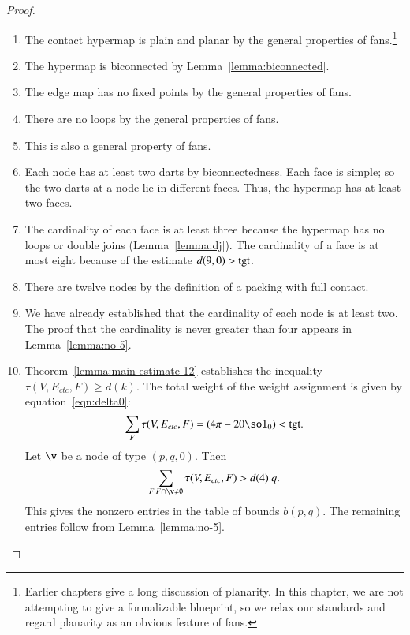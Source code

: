 \documentclass{llncs}
\def\op#1{{\hbox{#1}}}
\begin{document}
\begin{proof}
\begin{enumerate}
\item {} The contact hypermap is plain and planar by the
  general properties of fans.\footnote{Earlier chapters give a long
    discussion of planarity.  In this chapter, we are not attempting
    to give a formalizable blueprint, so we relax our standards and
    regard planarity as an obvious feature of fans.}
\item {} The hypermap is biconnected by
  Lemma~\ref{lemma:biconnected}.
\item {} The
  edge map has no fixed points by the general properties of fans.
\item {} 
  There are no loops by the general properties of
  fans.
\item {} This is also a general property of fans.
\item {} Each node has at least two darts by
  biconnectedness. Each face is simple; so the two darts at a node lie
  in different faces.  Thus, the hypermap has at least two faces.
\item {} The cardinality of each face is at least three
  because the hypermap has no loops or double joins (Lemma~\ref{lemma:dj}).
  The cardinality of a face is at most eight because of the estimate
  $d(9,0)>\op{tgt}$.
\item {} There are twelve nodes by the definition of a
  packing with full contact.
\item {} We have already established that the cardinality
  of each node is at least two.  The proof that the cardinality is
  never  greater than four appears in Lemma~\ref{lemma:no-5}.
\item {} Theorem~\ref{lemma:main-estimate-12} establishes 
 the inequality $\tau(V,E_{ctc},F)\ge d(k)$.
  The total weight of the weight assignment is given by
  equation~\eqref{eqn:delta0}:
\[
  \sum_F \tau(V,E_{ctc},F) = (4\pi - 20\sol_0) < \op{tgt}.
\]
%
Let $\v$ be a node of type $(p,q,0)$.  
Then
\[
\sum_{F\mid F\cap \v\ne\emptyset}\tau(V,E_{ctc},F) > d(4)~q.
\]
This gives the nonzero entries in the table of bounds $b(p,q)$.  The
remaining entries follow from Lemma~\ref{lemma:no-5}.
\end{enumerate}
\end{proof}
\end{document}

